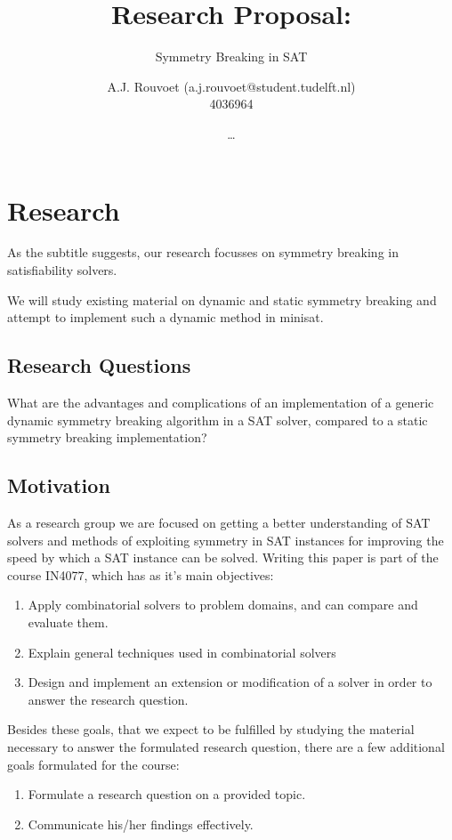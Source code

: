 \documentclass[a4paper]{scrartcl}
\title{Research Proposal:}
\author{
		A.J. Rouvoet (a.j.rouvoet@student.tudelft.nl) \\ 4036964 \and
		\ldots
	}
\subtitle{Symmetry Breaking in SAT}
\begin{document}
	\maketitle
	\newpage

	\section{Research}
		As the subtitle suggests, our research focusses on symmetry breaking in satisfiability
		solvers.

		We will study existing material on dynamic and static symmetry breaking and attempt to
		implement such a dynamic method in minisat.

		\subsection{Research Questions}
			What are the advantages and complications of an implementation of a generic dynamic
			symmetry breaking algorithm in a SAT solver, compared to a static symmetry breaking
			implementation?

		\subsection{Motivation}
			As a research group we are focused on getting a better understanding of SAT solvers and
			methods of exploiting symmetry in SAT instances for improving the speed by which a SAT
			instance can be solved.
			Writing this paper is part of the course IN4077, which has as it's main objectives:

			\begin{enumerate}
				\item
					Apply combinatorial solvers to problem domains, and can compare and evaluate
					them.
				\item
					Explain general techniques used in combinatorial solvers
				\item
					Design and implement an extension or modification of a solver in order to answer
					the research question.
			\end{enumerate}

			Besides these goals, that we expect to be fulfilled by studying the material necessary
			to answer the formulated research question, there are a few additional goals formulated
			for the course:

			\begin{enumerate}
				\item Formulate a research question on a provided topic.
				\item Communicate his/her findings effectively.
			\end{enumerate}
\end{document}
